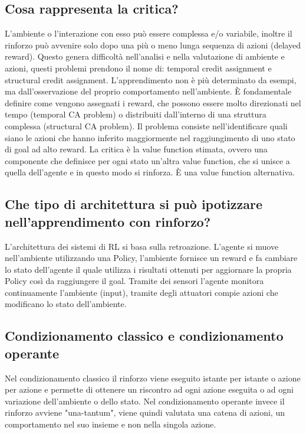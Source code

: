 \documentclass[\main/main.tex]{subfiles}
\begin{document}
\subsection{Cosa rappresenta la critica?}
L'ambiente o l'interazione con esso può essere complessa e/o variabile, inoltre il rinforzo può avvenire solo dopo una più o meno lunga sequenza di azioni (delayed reward).
Questo genera difficoltà nell'analisi e nella valutazione di ambiente e azioni, questi problemi prendono il nome di: temporal credit assignment e structural credit assignment.
L'apprendimento non è più determinato da esempi, ma dall'osservazione del proprio comportamento nell'ambiente.
È fondamentale definire come vengono assegnati i reward, che possono essere molto direzionati nel tempo (temporal CA problem) o distribuiti dall'interno di una struttura complessa (structural CA problem).
Il problema consiste nell'identificare quali siano le azioni che hanno inferito maggiormente nel raggiungimento di uno stato di goal ad alto reward.
La critica è la value function stimata, ovvero una componente che definisce per ogni stato un'altra value function, che si unisce a quella dell'agente e in questo modo si rinforza. È una value function alternativa.

\subsection{Che tipo di architettura si può ipotizzare nell'apprendimento con rinforzo?}
L'architettura dei sistemi di RL si basa sulla retroazione. L'agente si muove nell'ambiente utilizzando una Policy, l'ambiente fornisce un reward e fa cambiare lo stato dell'agente il quale utilizza i risultati ottenuti per aggiornare la propria Policy così da raggiungere il goal.
Tramite dei sensori l'agente monitora continuamente l'ambiente (input), tramite degli attuatori compie azioni che modificano lo stato dell'ambiente.

\subsection{Condizionamento classico e condizionamento operante}
Nel condizionamento classico il rinforzo viene eseguito istante per istante o azione per azione e permette di ottenere un riscontro ad ogni azione eseguita o ad ogni variazione dell'ambiente o dello stato.
Nel condizionamento operante invece il rinforzo avviene "una-tantum", viene quindi valutata una catena di azioni, un comportamento nel suo insieme e non nella singola azione.
\end{document}
